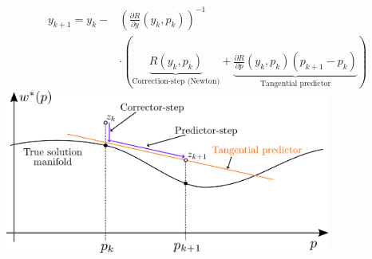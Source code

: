 \begin{tcolorbox}[colback=violet!5!white, %
  colframe=violet!75!black, %
  title=\textbf{Parametric Nonlinear Optimization}]
\begin{itemize}
  \end{itemize}
  \begin{align*}
    y_{k+1}=y_k - 
    &\left(
    \frac{\partial R}{\partial y}(y_k, p_k)
    \right)^{-1} \\
    & \cdot
    \left(
      \underbrace{R(y_k, p_k)}_{\text{Correction-step (Newton)}} +
      \underbrace{\frac{\partial R}{\partial p}(y_k, p_k)(p_{k+1} - p_k)}_{\text{Tangential predictor}}
    \right)
  \end{align*}
  \includegraphics[width=0.8\textwidth]{pred_correct_alg}

  
\end{tcolorbox}

